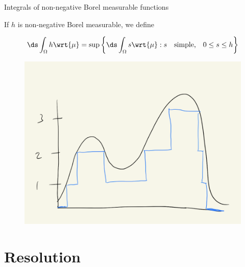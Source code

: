 \documentclass[10pt]{beamer}
\begin{document}
\begin{frame}{Integrals of non-negative Borel measurable functions}
\begin{definition}

If $h$ is non-negative Borel measurable, we define 

\[  \ds\int_{\Omega} h \wrt{\mu} = \sup \bigg\{ \ds\int_{\Omega} s \wrt{\mu} : s \quad \text{simple,} \quad 0 \leq s \leq h  \bigg\} \]
\label{def:integral_of_non_negative_Borel_measurable_function}
\end{definition}


\begin{figure}[H]
\centering
\includegraphics[width=.4\textwidth]{images/simple_function_approximating_non_negative_function}	
\end{figure}

\end{frame}

%
%
%
%
%
%
%
%


\section{Resolution}
\end{document}
